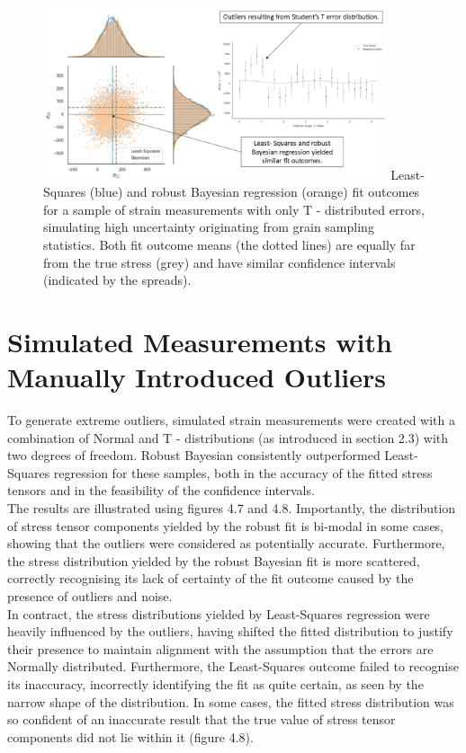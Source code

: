 \begin{figure}[H]
 	\centering
 	\includegraphics[width=0.9\textwidth]{chapters/chapter03/fig03/s33D.png}
 	\mycaption
 	{Least-Squares (blue) and robust Bayesian regression (orange) fit outcomes for a sample of strain measurements with only T - distributed errors, simulating high uncertainty originating from grain sampling statistics. Both fit outcome means (the dotted lines) are equally far from the true stress (grey) and have similar confidence intervals (indicated by the spreads).}
    \label{fig:RHP02}
 \end{figure}


\section{Simulated Measurements with Manually Introduced Outliers}
\label{sec:sec01}

To generate extreme outliers, simulated strain measurements were created with a combination of Normal and T - distributions (as introduced in section 2.3) with two degrees of freedom. Robust Bayesian consistently outperformed Least-Squares regression for these samples, both in the accuracy of the fitted stress tensors and in the feasibility of the confidence intervals. \\

The results are illustrated using figures 4.7 and 4.8. Importantly, the distribution of stress tensor components yielded by the robust fit is bi-modal in some cases, showing that the outliers were considered as potentially accurate. Furthermore, the stress distribution yielded by the robust Bayesian fit is more scattered, correctly recognising its lack of certainty of the fit outcome caused by the presence of outliers and noise.\\

In contract, the stress distributions yielded by Least-Squares regression were heavily influenced by the outliers, having shifted the fitted distribution to justify their presence to maintain alignment with the assumption that the errors are Normally distributed. Furthermore, the Least-Squares outcome failed to recognise its inaccuracy, incorrectly identifying the fit as quite certain, as seen by the narrow shape of the distribution. In some cases, the fitted stress distribution was so confident of an inaccurate result that the true value of stress tensor components did not lie within it (figure 4.8). 

